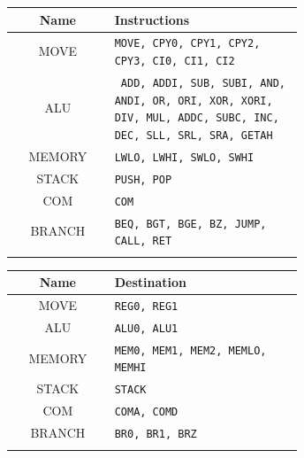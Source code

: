 \begin{blockpage}
	\begin{tabular}{| c | p{0.65\linewidth} |} \hline 
		\rowcolor[rgb]{0.82,0.82,0.82}
		Name & Instructions \\\hline
		MOVE & \texttt{MOVE, CPY0, CPY1, CPY2, CPY3, CI0, CI1, CI2} \\\hline
		ALU & \texttt{%
			ADD, ADDI,
			SUB, SUBI,
			AND, ANDI,
			OR, ORI,
			XOR, XORI,
			DIV, MUL,
			ADDC, SUBC,
			INC, DEC,
			SLL, SRL, 
			SRA, GETAH
		} \\\hline
		MEMORY & \texttt{LWLO, LWHI, SWLO, SWHI} \\\hline
		STACK  & \texttt{PUSH, POP} \\\hline
		COM & \texttt{COM} \\\hline
		BRANCH & \texttt{BEQ, BGT, BGE, BZ, JUMP, CALL, RET} \\\hline
		\arrayrulecolor[rgb]{0,0,0}\hline
	\end{tabular}
	\label{tab:instr_groups_risc}
\end{blockpage}

\begin{blockpage}
	\begin{tabular}{| c | p{0.65\linewidth}|} \hline 
		\rowcolor[rgb]{0.82,0.82,0.82}
		Name & Destination \\\hline
		\arrayrulecolor[rgb]{0.82,0.82,0.82}
		MOVE & \texttt{REG0, REG1} \\\hline
		ALU & \texttt{ALU0, ALU1} \\\hline
		MEMORY & \texttt{MEM0, MEM1, MEM2, MEMLO, MEMHI} \\\hline
		STACK  & \texttt{STACK}\\\hline
		COM & \texttt{COMA, COMD}\\\hline
		BRANCH & \texttt{BR0, BR1, BRZ}\\\hline
		\arrayrulecolor[rgb]{0,0,0}\hline
	\end{tabular}
	\label{tab:instr_groups_oisc_dst}
\end{blockpage}

